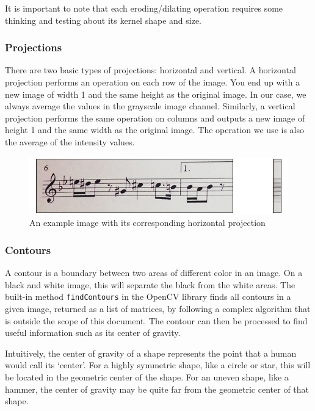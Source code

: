 It is important to note that each eroding/dilating operation requires some thinking and testing about its kernel shape and size.

\subsubsection{Projections} \label{sec:projections}

There are two basic types of projections: horizontal and vertical. A horizontal projection performs an operation on each row of the image. You end up with a new image of width 1 and the same height as the original image. In our case, we always average the values in the grayscale image channel.
Similarly, a vertical projection performs the same operation on columns and outputs a new image of height 1 and the same width as the original image. The operation we use is also the average of the intensity values.

\begin{figure}[h!]
	\centering
	\includegraphics[width=1\textwidth]{./assets/projectionBackground.png}
	\caption{An example image with its corresponding horizontal projection}
	\label{image:projectionBackground}
\end{figure}

\subsubsection{Contours} \label{sec:contour}

A contour is a boundary between two areas of different color in an image. On a black and white image, this will separate the black from the white areas. The built-in method \verb!findContours!\cite{findContours} in the OpenCV library finds all contours in a given image, returned as a list of matrices, by following a complex algorithm that is outside the scope of this document. The contour can then be processed to find useful information such as its center of gravity.

Intuitively, the center of gravity of a shape represents the point that a human would call its \lq center\rq . For a highly symmetric shape, like a circle or star, this will be located in the geometric center of the shape. For an uneven shape, like a hammer, the center of gravity may be quite far from the geometric center of that shape.

